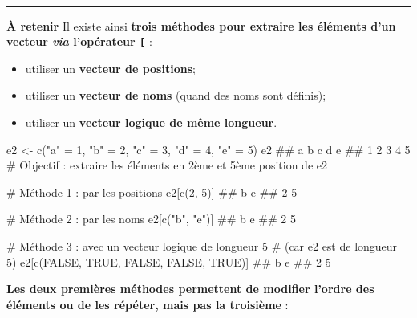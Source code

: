 \documentclass[12pt,twosided, notitlepage]{book}
\newenvironment{Shaded}{}{}
\newcommand{\KeywordTok}[1]{\textcolor[rgb]{0.00,0.00,1.00}{#1}}
\newcommand{\DecValTok}[1]{#1}
\newcommand{\StringTok}[1]{\textcolor[rgb]{0.00,0.50,0.50}{#1}}
\newcommand{\CommentTok}[1]{\textcolor[rgb]{0.00,0.50,0.00}{#1}}
\newcommand{\OtherTok}[1]{\textcolor[rgb]{1.00,0.25,0.00}{#1}}
\newcommand{\NormalTok}[1]{#1}
\providecommand{\tightlist}{%
  \setlength{\itemsep}{0pt}\setlength{\parskip}{0pt}}
\renewenvironment{Shaded}{\begin{snugshade}}{\end{snugshade}}
\begin{document}
~

\begin{center}\rule{0.5\linewidth}{\linethickness}\end{center}

\textbf{À retenir} Il existe ainsi \textbf{trois méthodes pour extraire
les éléments d'un vecteur \emph{via} l'opérateur
\texttt{{[}}}\index{\texttt{[}} :

\begin{itemize}
\tightlist
\item
  utiliser un \textbf{vecteur de positions};
\item
  utiliser un \textbf{vecteur de noms} (quand des noms sont définis);
\item
  utiliser un \textbf{vecteur logique de même longueur}.
\end{itemize}

\begin{Shaded}
\begin{Highlighting}[]
\NormalTok{e2 <-}\StringTok{ }\KeywordTok{c}\NormalTok{(}\StringTok{"a"}\NormalTok{ =}\StringTok{ }\DecValTok{1}\NormalTok{, }\StringTok{"b"}\NormalTok{ =}\StringTok{ }\DecValTok{2}\NormalTok{, }\StringTok{"c"}\NormalTok{ =}\StringTok{ }\DecValTok{3}\NormalTok{, }\StringTok{"d"}\NormalTok{ =}\StringTok{ }\DecValTok{4}\NormalTok{, }\StringTok{"e"}\NormalTok{ =}\StringTok{ }\DecValTok{5}\NormalTok{)}
\NormalTok{e2}
\NormalTok{  ## a b c d e }
\NormalTok{  ## 1 2 3 4 5}
\CommentTok{# Objectif : extraire les éléments en 2ème et 5ème position de e2}

\CommentTok{# Méthode 1 : par les positions}
\NormalTok{e2[}\KeywordTok{c}\NormalTok{(}\DecValTok{2}\NormalTok{, }\DecValTok{5}\NormalTok{)]}
\NormalTok{  ## b e }
\NormalTok{  ## 2 5}

\CommentTok{# Méthode 2 : par les noms}
\NormalTok{e2[}\KeywordTok{c}\NormalTok{(}\StringTok{"b"}\NormalTok{, }\StringTok{"e"}\NormalTok{)]}
\NormalTok{  ## b e }
\NormalTok{  ## 2 5}

\CommentTok{# Méthode 3 : avec un vecteur logique de longueur 5}
\CommentTok{# (car e2 est de longueur 5)}
\NormalTok{e2[}\KeywordTok{c}\NormalTok{(}\OtherTok{FALSE}\NormalTok{, }\OtherTok{TRUE}\NormalTok{, }\OtherTok{FALSE}\NormalTok{, }\OtherTok{FALSE}\NormalTok{, }\OtherTok{TRUE}\NormalTok{)]}
\NormalTok{  ## b e }
\NormalTok{  ## 2 5}
\end{Highlighting}
\end{Shaded}

\textbf{Les deux premières méthodes permettent de modifier l'ordre des
éléments ou de les répéter, mais pas la troisième} :
\end{document}
